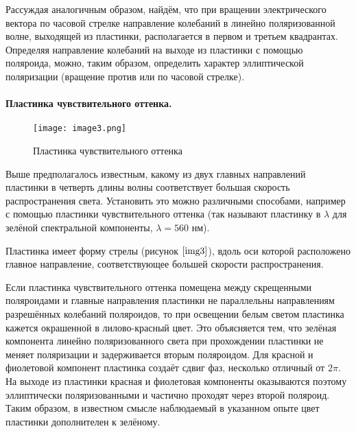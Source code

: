 \documentclass[a4paper,12pt]{article} %
\begin{document}
Рассуждая аналогичным образом, найдём, что при вращении электрического вектора по часовой стрелке направление колебаний в линейно поляризованной волне, выходящей из пластинки, располагается в первом и третьем квадрантах. Определяя направление колебаний на выходе из пластинки с помощью поляроида, можно, таким образом, определить характер эллиптической поляризации (вращение против или по часовой стрелке).

\paragraph{Пластинка чувствительного оттенка.}

\begin{wrapfigure}{l}{0.35\linewidth}
    \texttt{[image: image3.png]}
    \caption{Пластинка чувствительного оттенка}
    \label{img3}
\end{wrapfigure}

Выше предполагалось известным, какому из двух главных направлений пластинки в четверть длины волны соответствует большая скорость распространения света. Установить это можно различными способами, например с помощью пластинки чувствительного оттенка (так называют пластинку в $\lambda$ для зелёной спектральной компоненты, $\lambda=560$ нм).

Пластинка имеет форму стрелы (рисунок $\ref{img3}$), вдоль оси которой расположено главное направление, соответствующее большей скорости распространения.

Если пластинка чувствительного оттенка помещена между скрещенными поляроидами и главные направления пластинки не параллельны направлениям разрешённых колебаний поляроидов, то при освещении
белым светом пластинка кажется окрашенной в лилово-красный цвет. Это объясняется тем, что зелёная компонента линейно поляризованного света при прохождении пластинки не меняет поляризации и задерживается вторым поляроидом. Для красной и фиолетовой компонент пластинка создаёт сдвиг фаз, несколько отличный от $2\pi$. На выходе из пластинки красная и фиолетовая компоненты оказываются поэтому эллиптически поляризованными и частично проходят через второй поляроид. Таким образом, в известном смысле наблюдаемый в указанном опыте цвет пластинки дополнителен к зелёному.
\end{document}
